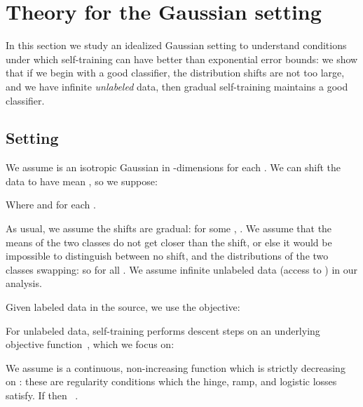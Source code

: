 \documentclass[11pt]{article}
\newcommand{\pl}[1]{}
\newcommand{\ak}[1]{}
\begin{document}
\pl{nice results, but it's a bit too bad that you don't give any details of
the actual examples; space is a concern but are they complex? is there anything you can do?}
 
\section{Theory for the Gaussian setting}
\label{sec:gaussian_theory}



In this section we study an idealized Gaussian setting to understand conditions under which self-training can have better than exponential error bounds: we show that if we begin with a good classifier, the distribution shifts are not too large, and we have infinite \emph{unlabeled} data, then gradual self-training maintains a good classifier.

\subsection{Setting}

We assume  is an isotropic Gaussian in -dimensions for each .
We can shift the data to have mean , so we suppose:

Where  and  for each .
\pl{uh, you can do that for one time step, but doesn't make sense across time steps? doesn't seem fully general}
\ak{If you have infinite unlabeled data, and it’s isotropic, you can just shift the data in the current domain its mean. If the original shifts between domain 1 and 2 is small, then the shifts in the mean-centered data from 1 and 2 will be small as well.}
As usual, we assume the shifts are gradual: for some , .
We assume that the means of the two classes do not get closer than the shift, or else it would be impossible to distinguish between no shift, and the distributions of the two classes swapping: so  for all .
We assume infinite unlabeled data (access to ) in our analysis.

Given labeled data in the source, we use the objective:

For unlabeled data, self-training performs descent steps on an underlying objective function~\cite{amini2003semisupervised}, which we focus on:

We assume  is a continuous, non-increasing function which is strictly decreasing on : these are regularity conditions which the hinge, ramp, and logistic losses satisfy. If  then ~\cite{amini2003semisupervised}.
\pl{why not just use  instead of  to make the notation consistent with previous section?}
\ak{there's no bias term here, and I use  for the weights before (and in the appendices), is that fine?}
\end{document}
